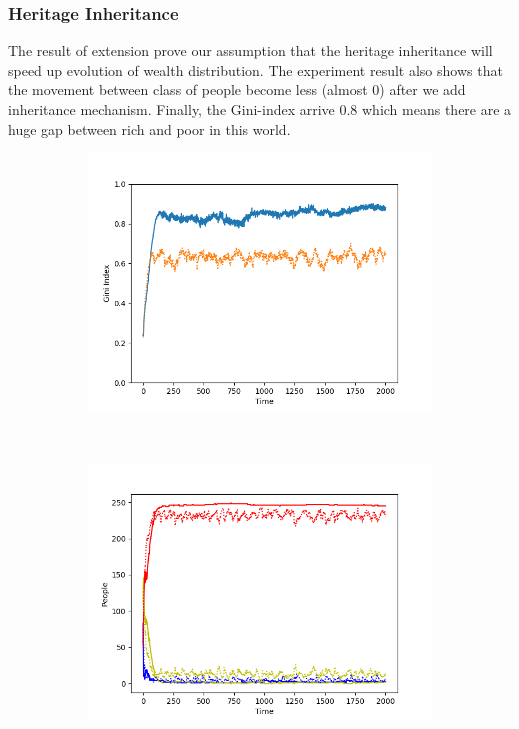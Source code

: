 \subsubsection{Heritage Inheritance}
The result of extension prove our assumption that the heritage inheritance will speed up evolution of wealth distribution. The experiment result also shows that the movement between class of people become less (almost 0) after we add inheritance mechanism. Finally, the Gini-index arrive 0.8 which means there are a huge gap between rich and poor in this world.
\begin{figure}[h]
	\centering
	\begin{subfigure}[t]{0.5\textwidth}
		\centering
		\includegraphics[scale=0.5]{inheritance_gini.png}
	\end{subfigure}%
	~ 
	\begin{subfigure}[t]{0.5\textwidth}
		\centering
		\includegraphics[scale=0.5]{inheritance_classes.png}
	\end{subfigure}
\end{figure}

